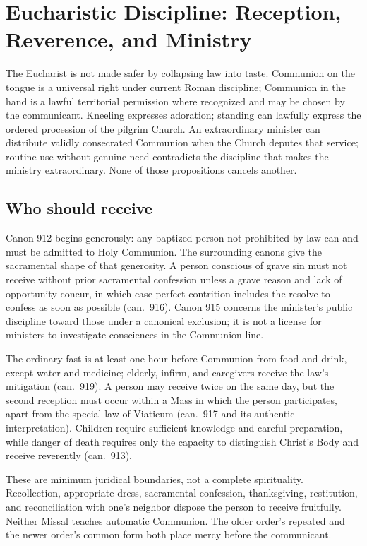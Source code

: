 \section{Eucharistic Discipline: Reception, Reverence, and Ministry}

The Eucharist is not made safer by collapsing law into taste. Communion on the tongue is a universal right under current Roman discipline; Communion in the hand is a lawful territorial permission where recognized and may be chosen by the communicant. Kneeling expresses adoration; standing can lawfully express the ordered procession of the pilgrim Church. An extraordinary minister can distribute validly consecrated Communion when the Church deputes that service; routine use without genuine need contradicts the discipline that makes the ministry extraordinary. None of those propositions cancels another.

\subsection{Who should receive}

Canon 912 begins generously: any baptized person not prohibited by law can and must be admitted to Holy Communion. The surrounding canons give the sacramental shape of that generosity. A person conscious of grave sin must not receive without prior sacramental confession unless a grave reason and lack of opportunity concur, in which case perfect contrition includes the resolve to confess as soon as possible (can.~916). Canon 915 concerns the minister's public discipline toward those under a canonical exclusion; it is not a license for ministers to investigate consciences in the Communion line.

The ordinary fast is at least one hour before Communion from food and drink, except water and medicine; elderly, infirm, and caregivers receive the law's mitigation (can.~919). A person may receive twice on the same day, but the second reception must occur within a Mass in which the person participates, apart from the special law of Viaticum (can.~917 and its authentic interpretation). Children require sufficient knowledge and careful preparation, while danger of death requires only the capacity to distinguish Christ's Body and receive reverently (can.~913).

These are minimum juridical boundaries, not a complete spirituality. Recollection, appropriate dress, sacramental confession, thanksgiving, restitution, and reconciliation with one's neighbor dispose the person to receive fruitfully. Neither Missal teaches automatic Communion. The older order's repeated  and the newer order's common form both place mercy before the communicant.

